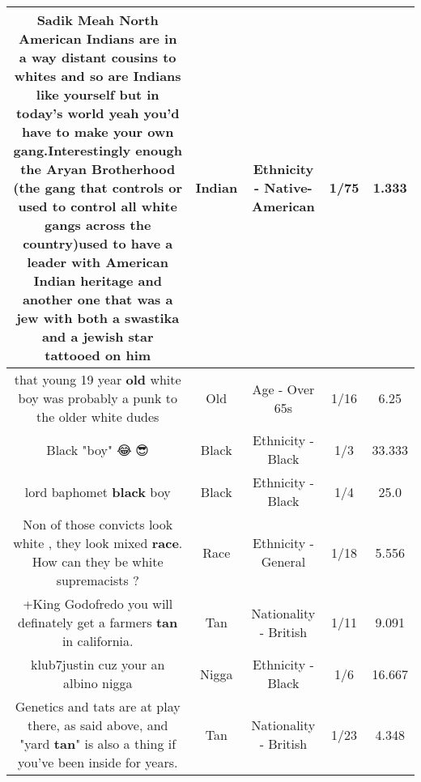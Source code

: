 \documentclass[11pt]{article}
\newlength\mylength
\begin{document}
\begin{center}
\begin{longtable}{|C{.65\mylength}|C{.30\mylength}|C{.12\mylength}|C{.12\mylength}|C{.12\mylength}|}
  \small Sadik Meah North American Indians are in a way distant cousins to whites and so are Indians like yourself but in today's world yeah you'd have to make your own gang.Interestingly enough the Aryan Brotherhood (the gang that controls or used to control all white gangs across the country)used to have a leader with American \textbf{Indian} heritage and another one that was a jew with both a swastika and a jewish star tattooed on him\normalsize   & Indian & Ethnicity - Native-American & 1/75 & 1.333 \\  \hline
  \small that young 19 year \textbf{old} white boy was probably a punk to the older white dudes\normalsize   & Old & Age - Over 65s & 1/16 & 6.25 \\  \hline
  \small Black "boy" 😂💯😎\normalsize   & Black & Ethnicity - Black & 1/3 & 33.333 \\  \hline
  \small lord baphomet \textbf{black} boy\normalsize   & Black & Ethnicity - Black & 1/4 & 25.0 \\  \hline
  \small Non of those convicts look white , they look mixed \textbf{race}. How can they be white supremacists ?\normalsize   & Race & Ethnicity - General & 1/18 & 5.556 \\  \hline
  \small +King Godofredo you will definately get a farmers \textbf{tan} in california.\normalsize   & Tan & Nationality - British & 1/11 & 9.091 \\  \hline
  \small klub7justin cuz your an albino nigga\normalsize   & Nigga & Ethnicity - Black & 1/6 & 16.667 \\  \hline
  \small Genetics and tats are at play there, as said above, and "yard \textbf{tan}" is also a thing if you've been inside for years.\normalsize   & Tan & Nationality - British & 1/23 & 4.348 \\  \hline

\end{longtable}
\end{center}
\end{document}

